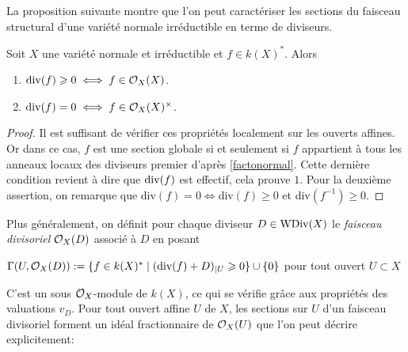 La proposition suivante montre que l'on peut caractériser les sections du faisceau structural d'une variété normale irréductible en terme de diviseurs.

\begin{prop}\label{caracfaisceaustructdiv}
Soit $X$ une variété normale et irréductible et $f\in k(X)^*$. Alors 
\begin{enumerate}
\item $\operatorname{div}(f)\geqslant 0\iff f \in\mathcal{O}_X(X)$.
\item $\operatorname{div}(f)= 0\iff f\in\mathcal{O}_X(X)^\times$.
\end{enumerate}
\end{prop}
\begin{proof}
Il est suffisant de vérifier ces propriétés localement sur les ouverts affines. Or dans ce cas, $f$ est une section globale si et seulement si $f$ appartient à tous les anneaux locaux des diviseurs premier d'après \ref{factonormal}. Cette dernière condition revient à dire que $\operatorname{div}(f)$ est effectif, cela prouve $1$. Pour la deuxième assertion, on remarque que div$(f)=0\iff$div$(f)\geq 0$ et div$(f^{-1})\geq 0$.
\end{proof}

Plus généralement, on définit pour chaque diviseur $D\in \operatorname{WDiv}(X)$ le \textit{faisceau divisoriel} $\mathcal{O}_X(D)$ associé à $D$ en posant
\begin{center}
$\Gamma(U,\mathcal{O}_X(D)):=\lbrace f\in k(X)^* \mid (\textrm{div}(f)+D)_{|U}\geqslant 0\rbrace\cup \lbrace 0 \rbrace$ pour tout ouvert $U\subset X$
\end{center}
C'est un sous $\mathcal{O}_X$-module de $k(X)$, ce qui se vérifie grâce aux propriétés des valuations $v_D$. Pour tout ouvert affine $U$ de $X$, les sections sur $U$ d'un faisceau divisoriel forment un idéal fractionnaire de $\mathcal{O}_X(U)$ que l'on peut décrire explicitement:

